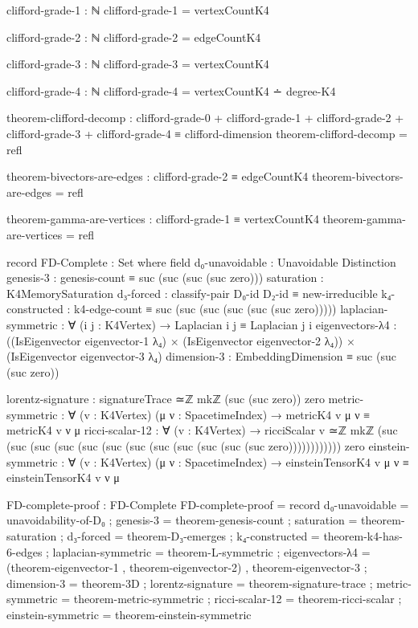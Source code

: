\documentclass[11pt,a4paper]{book}
\begin{document}
\begin{code}
clifford-grade-1 : ℕ  
clifford-grade-1 = vertexCountK4

clifford-grade-2 : ℕ
clifford-grade-2 = edgeCountK4

clifford-grade-3 : ℕ
clifford-grade-3 = vertexCountK4

clifford-grade-4 : ℕ
clifford-grade-4 = vertexCountK4 ∸ degree-K4

theorem-clifford-decomp : clifford-grade-0 + clifford-grade-1 + clifford-grade-2 
                        + clifford-grade-3 + clifford-grade-4 ≡ clifford-dimension
theorem-clifford-decomp = refl

theorem-bivectors-are-edges : clifford-grade-2 ≡ edgeCountK4
theorem-bivectors-are-edges = refl

theorem-gamma-are-vertices : clifford-grade-1 ≡ vertexCountK4
theorem-gamma-are-vertices = refl

record FD-Complete : Set where
  field
    d₀-unavoidable    : Unavoidable Distinction
    genesis-3         : genesis-count ≡ suc (suc (suc (suc zero)))
    saturation        : K4MemorySaturation
    d₃-forced         : classify-pair D₀-id D₂-id ≡ new-irreducible
    k₄-constructed    : k4-edge-count ≡ suc (suc (suc (suc (suc (suc zero)))))
    laplacian-symmetric : ∀ (i j : K4Vertex) → Laplacian i j ≡ Laplacian j i
    eigenvectors-λ4   : ((IsEigenvector eigenvector-1 λ₄) × (IsEigenvector eigenvector-2 λ₄)) × 
                        (IsEigenvector eigenvector-3 λ₄)
    dimension-3       : EmbeddingDimension ≡ suc (suc (suc zero))
    
    lorentz-signature : signatureTrace ≃ℤ mkℤ (suc (suc zero)) zero
    metric-symmetric  : ∀ (v : K4Vertex) (μ ν : SpacetimeIndex) → metricK4 v μ ν ≡ metricK4 v ν μ
    ricci-scalar-12   : ∀ (v : K4Vertex) → ricciScalar v ≃ℤ mkℤ (suc (suc (suc (suc (suc (suc (suc (suc (suc (suc (suc (suc zero)))))))))))) zero
    einstein-symmetric : ∀ (v : K4Vertex) (μ ν : SpacetimeIndex) → einsteinTensorK4 v μ ν ≡ einsteinTensorK4 v ν μ

FD-complete-proof : FD-Complete
FD-complete-proof = record
  { d₀-unavoidable    = unavoidability-of-D₀
  ; genesis-3         = theorem-genesis-count
  ; saturation        = theorem-saturation
  ; d₃-forced         = theorem-D₃-emerges
  ; k₄-constructed    = theorem-k4-has-6-edges
  ; laplacian-symmetric = theorem-L-symmetric
  ; eigenvectors-λ4   = (theorem-eigenvector-1 , theorem-eigenvector-2) , theorem-eigenvector-3
  ; dimension-3       = theorem-3D
  ; lorentz-signature = theorem-signature-trace
  ; metric-symmetric  = theorem-metric-symmetric
  ; ricci-scalar-12   = theorem-ricci-scalar
  ; einstein-symmetric = theorem-einstein-symmetric
  }



\end{code}
\end{document}
